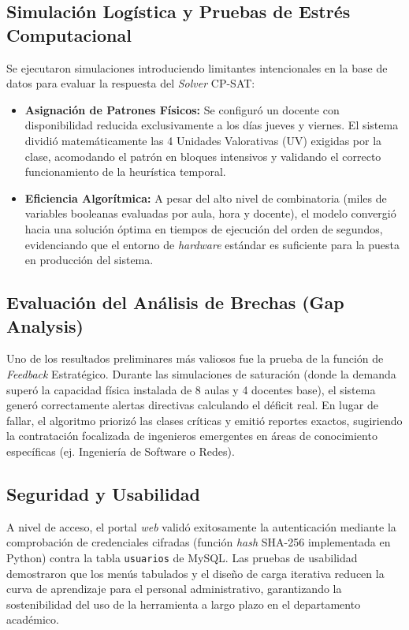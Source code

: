 \subsection{Simulación Logística y Pruebas de Estrés Computacional}
Se ejecutaron simulaciones introduciendo limitantes intencionales en la base de datos para evaluar la respuesta del \textit{Solver} CP-SAT:
\begin{itemize}
    \item \textbf{Asignación de Patrones Físicos:} Se configuró un docente con disponibilidad reducida exclusivamente a los días jueves y viernes. El sistema dividió matemáticamente las 4 Unidades Valorativas (UV) exigidas por la clase, acomodando el patrón en bloques intensivos y validando el correcto funcionamiento de la heurística temporal.
    \item \textbf{Eficiencia Algorítmica:} A pesar del alto nivel de combinatoria (miles de variables booleanas evaluadas por aula, hora y docente), el modelo convergió hacia una solución óptima en tiempos de ejecución del orden de segundos, evidenciando que el entorno de \textit{hardware} estándar es suficiente para la puesta en producción del sistema.
\end{itemize}

\subsection{Evaluación del Análisis de Brechas (Gap Analysis)}
Uno de los resultados preliminares más valiosos fue la prueba de la función de \textit{Feedback} Estratégico. Durante las simulaciones de saturación (donde la demanda superó la capacidad física instalada de 8 aulas y 4 docentes base), el sistema generó correctamente alertas directivas calculando el déficit real. En lugar de fallar, el algoritmo priorizó las clases críticas y emitió reportes exactos, sugiriendo la contratación focalizada de ingenieros emergentes en áreas de conocimiento específicas (ej. Ingeniería de Software o Redes).

\subsection{Seguridad y Usabilidad}
A nivel de acceso, el portal \textit{web} validó exitosamente la autenticación mediante la comprobación de credenciales cifradas (función \textit{hash} SHA-256 implementada en Python) contra la tabla \texttt{usuarios} de MySQL. Las pruebas de usabilidad demostraron que los menús tabulados y el diseño de carga iterativa reducen la curva de aprendizaje para el personal administrativo, garantizando la sostenibilidad del uso de la herramienta a largo plazo en el departamento académico.